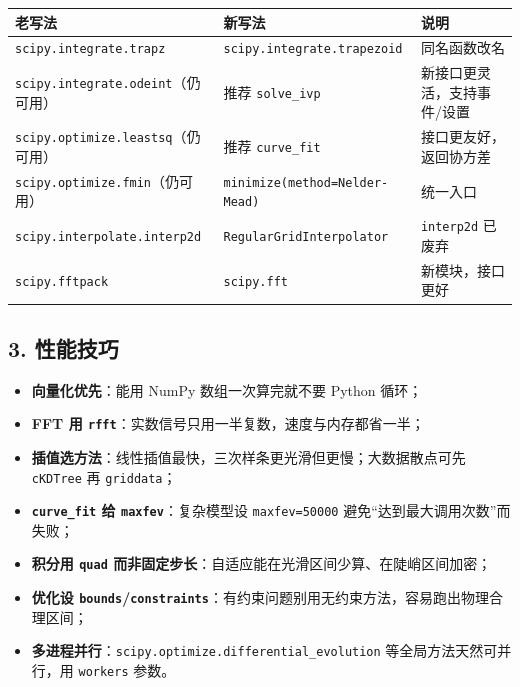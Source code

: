 {\def\LTcaptype{none} %
\begin{longtable}[]{@{}
  >{\raggedright\arraybackslash}p{}
  >{\raggedright\arraybackslash}p{}
  >{\raggedright\arraybackslash}p{}@{}}
\toprule\noalign{}
\begin{minipage}[b]{\linewidth}\raggedright
老写法
\end{minipage} & \begin{minipage}[b]{\linewidth}\raggedright
新写法
\end{minipage} & \begin{minipage}[b]{\linewidth}\raggedright
说明
\end{minipage} \\
\midrule\noalign{}
\endhead
\bottomrule\noalign{}
\endlastfoot
\texttt{scipy.integrate.trapz} & \texttt{scipy.integrate.trapezoid} &
同名函数改名 \\
\texttt{scipy.integrate.odeint}（仍可用） & 推荐 \texttt{solve\_ivp} &
新接口更灵活，支持事件/设置 \\
\texttt{scipy.optimize.leastsq}（仍可用） & 推荐 \texttt{curve\_fit} &
接口更友好，返回协方差 \\
\texttt{scipy.optimize.fmin}（仍可用） &
\texttt{minimize(method=\textquotesingle{}Nelder-Mead\textquotesingle{})}
& 统一入口 \\
\texttt{scipy.interpolate.interp2d} & \texttt{RegularGridInterpolator} &
\texttt{interp2d} 已废弃 \\
\texttt{scipy.fftpack} & \texttt{scipy.fft} & 新模块，接口更好 \\
\end{longtable}
}

\subsection{3. 性能技巧}\label{ux6027ux80fdux6280ux5de7-2}

\begin{itemize}
\tightlist
\item
  \textbf{向量化优先}：能用 NumPy 数组一次算完就不要 Python 循环；
\item
  \textbf{FFT 用
  \texttt{rfft}}：实数信号只用一半复数，速度与内存都省一半；
\item
  \textbf{插值选方法}：线性插值最快，三次样条更光滑但更慢；大数据散点可先
  \texttt{cKDTree} 再 \texttt{griddata}；
\item
  \textbf{\texttt{curve\_fit} 给 \texttt{maxfev}}：复杂模型设
  \texttt{maxfev=50000} 避免``达到最大调用次数''而失败；
\item
  \textbf{积分用 \texttt{quad}
  而非固定步长}：自适应能在光滑区间少算、在陡峭区间加密；
\item
  \textbf{优化设
  \texttt{bounds}/\texttt{constraints}}：有约束问题别用无约束方法，容易跑出物理合理区间；
\item
  \textbf{多进程并行}：\texttt{scipy.optimize.differential\_evolution}
  等全局方法天然可并行，用 \texttt{workers} 参数。
\end{itemize}

